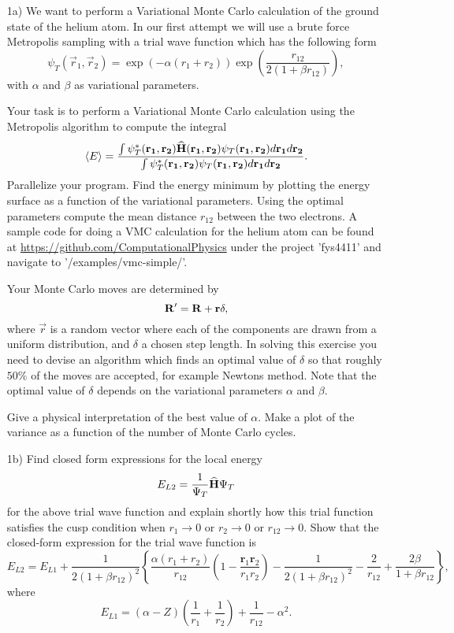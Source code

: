 \begin{enumerate}

\item[1a)]
We want to perform  a Variational Monte Carlo calculation of the ground state of the helium atom. In our first attempt we will use a brute force Metropolis sampling with a trial wave function which has the following form
\begin{equation}
   \psi_{T}( \vec r_1, \vec r_2) = 
   \exp{\left(-\alpha(r_1+r_2)\right)}
   \exp{\left(\frac{r_{12}}{2(1+\beta r_{12})}\right)}, 
\label{eq:trial}
\end{equation}
with $\alpha$ and $\beta$ as variational parameters.

Your task is to perform a Variational Monte Carlo calculation using the Metropolis algorithm to compute the integral
\begin{equation}
   \langle E \rangle =
   \frac{\int \psi^{\ast}_T({\bf r_1},{\bf r_2})\OP{H}({\bf r_1},{\bf r_2})\psi_T({\bf r_1},{\bf r_2}) d{\bf r_1}d{\bf r_2}}
        {\int\psi^{\ast}_T({\bf r_1},{\bf r_2})\psi_T({\bf r_1},{\bf r_2}) d{\bf r_1}d{\bf r_2}}.
\end{equation}
Parallelize your program. Find the energy minimum by plotting the energy surface as a function of the variational parameters. Using the optimal parameters compute the mean distance $r_{12}$ between the two electrons. A sample code for doing a VMC calculation for the helium atom can be found at \url{https://github.com/ComputationalPhysics} under the project 'fys4411' and navigate to '/examples/vmc-simple/'.

Your Monte Carlo moves are determined by
\begin{equation}
   {\bf R}' = {\bf R} + \vec r \delta ,
\end{equation}
where $\vec r$ is a random vector where each of the components are drawn from a uniform distribution, and $\delta$ a chosen step length. In solving this exercise you need to devise an algorithm which finds an optimal value of $\delta$ so that roughly $50\%$ of the moves are accepted, for example Newtons method. Note that the optimal value of $\delta$ depends on the variational parameters $\alpha$ and $\beta$. 

Give a physical  interpretation of the best value of $\alpha$. Make a plot of the variance as a function of the number of Monte Carlo cycles.

\item[1b)]
Find closed form expressions for the local energy 
\begin{equation}
  E_{L2} = {1 \over \Psi_T} \OP{H}\Psi_T
\end{equation}
for the above trial wave function and explain shortly how this trial function satisfies the cusp condition when $r_1\rightarrow 0$ or $r_2\rightarrow 0$ or  $r_{12}\rightarrow 0$. Show that the closed-form expression for the trial wave function is
\[ 
E_{L2} = E_{L1}+\frac{1}{2(1+\beta r_{12})^2}\left\{\frac{\alpha(r_1+r_2)}{r_{12}}(1-\frac{\mathbf{r}_1\mathbf{r}_2}{r_1r_2})-\frac{1}{2(1+\beta r_{12})^2}-\frac{2}{r_{12}}+\frac{2\beta}{1+\beta r_{12}}\right\},
\]
where
\[ 
E_{L1} = \left(\alpha-Z\right)\left(\frac{1}{r_1}+\frac{1}{r_2}\right)+\frac{1}{r_{12}}-\alpha^2.
\]


\end{enumerate}
